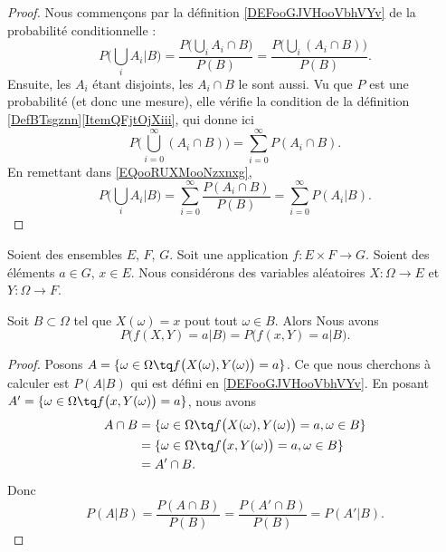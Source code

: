 \begin{proof}
	Nous commençons par la définition \ref{DEFooGJVHooVbhVYv} de la probabilité conditionnelle :
	\begin{equation}        \label{EQooRUXMooNzxnxg}
		P\big( \bigcup_iA_i|B \big)=\frac{ P\big( \bigcup_iA_i\cap B \big) }{ P(B) }=\frac{ P\big( \bigcup_i(A_i\cap B) \big) }{ P(B) }.
	\end{equation}
	Ensuite, les \( A_i\) étant disjoints, les \( A_i\cap B\) le sont aussi. Vu que \( P\) est une probabilité (et donc une mesure), elle vérifie la condition de la définition \ref{DefBTsgznn}\ref{ItemQFjtOjXiii}, qui donne ici
	\begin{equation}
		P\big( \bigcup_{i=0}^{\infty}(A_i\cap B) \big)=\sum_{i=0}^{\infty}P(A_i\cap B).
	\end{equation}
	En remettant dans \eqref{EQooRUXMooNzxnxg},
	\begin{equation}
		P\big( \bigcup_iA_i|B \big)=\sum_{i=0}^{\infty}\frac{ P(A_i\cap B) }{ P(B) }=\sum_{i=0}^{\infty}P(A_i|B).
	\end{equation}
\end{proof}

\begin{lemma}       \label{LEMooVYDTooGELPRY}
    Soient des ensembles \( E\), \( F\), \( G\). Soit une application \( f\colon E\times F\to G\). Soient des éléments \( a\in G\), \( x\in E\). Nous considérons des variables aléatoires \( X\colon \Omega\to E\) et \( Y\colon \Omega\to F\). 

    Soit \( B\subset \Omega\) tel que \( X(\omega)=x\) pout tout \( \omega\in B\). Alors Nous avons
    \begin{equation}
        P\big( f(X,Y)=a|B \big)=P\big( f(x,Y)=a|B \big).
    \end{equation}
\end{lemma}

\begin{proof}
    Posons \( A=\{ \omega\in \Omega\tq f\big( X(\omega),Y(\omega) \big)=a \}\). Ce que nous cherchons à calculer est \( P(A|B)\) qui est défini en \ref{DEFooGJVHooVbhVYv}. En posant \(  A'=\{ \omega\in\Omega\tq f\big( x,Y(\omega) \big)=a \} \),  nous avons
    \begin{subequations}
        \begin{align}
            A\cap B&=\{ \omega\in \Omega\tq f\big( X(\omega),Y(\omega) \big)=a, \omega\in B \}\\
            &=\{ \omega\in\Omega\tq f\big( x,Y(\omega) \big)=a,\omega\in B \}\\
            &=A'\cap B.
        \end{align}
    \end{subequations}
    Donc
    \begin{equation}
        P(A|B)=\frac{ P(A\cap B) }{ P(B) }=\frac{ P(A'\cap B) }{ P(B) }=P(A'|B).
    \end{equation}
\end{proof}


